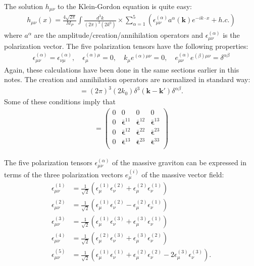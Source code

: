 \documentclass{book}
\theoremstyle{definition}
\newcommand{\al}{\alpha}
\newcommand{\be}{\beta}
\newcommand{\f}[2]{\frac{#1}{#2}}
\begin{document}
\begin{framed}
	The solution $h_{\mu\nu}$ to the Klein-Gordon equation is quite easy:
	\begin{align}
	h_{\mu\nu}(x) = \f{4\sqrt{2\pi}}{M_P}\int \f{d^3k}{(2\pi)^3 (2k^0)} \times \sum^5_{\al=1}(\epsilon^{(\al)}_{\mu\nu} a^\al (\mathbf{k}) e^{-ik\cdot x} + h.c.)
	\end{align} 
	where $a^\al$ are the amplitude/creation/annihilation operators and $\epsilon^{(\al)}_{\mu\nu}$ is the polarization vector. The five polarization tensors have the following properties:
	\begin{align}
	\boxed{\epsilon^{(\al)}_{\mu\nu} = \epsilon^{(\al)}_{\nu\mu}, \quad \epsilon^{(\al)\mu}_\mu = 0, \quad k_\mu e^{(\al)\mu\nu} = 0, \quad e^{(\al)}_{\mu\nu}e^{(\be)\mu\nu} = \delta^{\al\be} }
	\end{align}
	Again, these calculations have been done in the same sections earlier in this notes. The creation and annihilation operators are normalized in standard way:
	\begin{align}
	[a^\sigma(\mathbf{k}), a^{\be\dagger}(\mathbf{k}')] = (2\pi)^3 (2k_0) \delta^3(\mathbf{k} - \mathbf{k}')\delta^{\al\be}.
	\end{align}
	Some of these conditions imply that
	\begin{align}
	[\bar{\mathbf{\epsilon}}^{\mu\nu}] = \begin{pmatrix}
	0 &0&0&0\\
	0&\bar{\mathbf{\epsilon}}^{11}&\bar{\mathbf{\epsilon}}^{12}&\bar{\mathbf{\epsilon}}^{13}\\
	0&\bar{\mathbf{\epsilon}}^{12}&\bar{\mathbf{\epsilon}}^{22}&\bar{\mathbf{\epsilon}}^{23}\\
	0&\bar{\mathbf{\epsilon}}^{13}&\bar{\mathbf{\epsilon}}^{23}&\bar{\mathbf{\epsilon}}^{33}\\
	\end{pmatrix}
	\end{align}
	
	
	
	
	The five polarization tensors $\epsilon_{\mu\nu}^{(\al)}$ of the massive graviton can be expressed in terms of the three polarization vectors $e^{(i)}_\mu$ of the massive vector field:
	\begin{align}
	\epsilon_{\mu\nu}^{(1)} &= \f{1}{\sqrt{2}}(\epsilon_\mu^{(1)}\epsilon_\nu^{(2)} + \epsilon_\mu^{(2)}\epsilon_\nu^{(1)})\\
	\epsilon_{\mu\nu}^{(2)} &= \f{1}{\sqrt{2}}(\epsilon_\mu^{(1)}\epsilon_\nu^{(2)} - \epsilon_\mu^{(2)}\epsilon_\nu^{(1)})\\
	\epsilon_{\mu\nu}^{(3)} &= \f{1}{\sqrt{2}}(\epsilon_\mu^{(1)}\epsilon_\nu^{(3)} + \epsilon_\mu^{(3)}\epsilon_\nu^{(1)})\\
	\epsilon_{\mu\nu}^{(4)} &= \f{1}{\sqrt{2}}(\epsilon_\mu^{(2)}\epsilon_\nu^{(3)} + \epsilon_\mu^{(3)}\epsilon_\nu^{(2)})\\
	\epsilon_{\mu\nu}^{(5)} &= \f{1}{\sqrt{2}}(\epsilon_\mu^{(1)}\epsilon_\nu^{(1)} + \epsilon_\mu^{(2)}\epsilon_\nu^{(2)} - 2\epsilon_\mu^{(3)}\epsilon_\nu^{(3)}).
	\end{align}
	

\end{framed}
\end{document}
